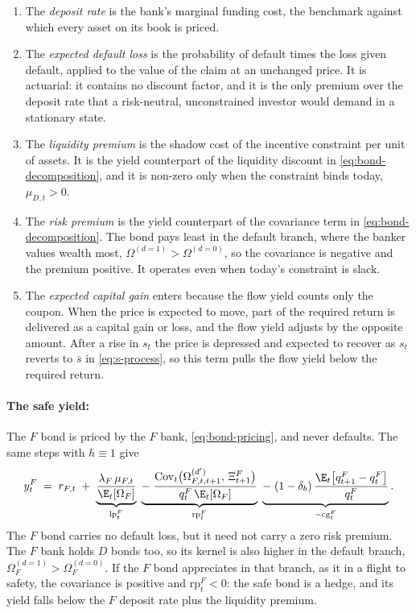 \begin{enumerate}
\item The \emph{deposit rate} is the bank's marginal funding cost, the
  benchmark against which every asset on its book is priced.
\item The \emph{expected default loss} is the probability of default times the
  loss given default, applied to the value of the claim at an unchanged price.
  It is actuarial: it contains no discount factor, and it is the only premium
  over the deposit rate that a risk-neutral, unconstrained investor would demand
  in a stationary state.
\item The \emph{liquidity premium} is the shadow cost of the incentive
  constraint per unit of assets. It is the yield counterpart of the
  liquidity discount in \eqref{eq:bond-decomposition}, and it is non-zero only
  when the constraint binds today, $\mu_{D,t}>0$.
\item The \emph{risk premium} is the yield counterpart of the covariance term in
  \eqref{eq:bond-decomposition}. The bond pays least in the default branch,
  where the banker values wealth most, $\Omega^{(d=1)}>\Omega^{(d=0)}$, so the
  covariance is negative and the premium positive. It operates even when
  today's constraint is slack.
\item The \emph{expected capital gain} enters because the flow yield counts only
  the coupon. When the price is expected to move, part of the required return is
  delivered as a capital gain or loss, and the flow yield adjusts by the
  opposite amount. After a rise in $s_t$ the price is depressed and expected to
  recover as $s_t$ reverts to $\bar s$ in \eqref{eq:s-process}, so this term
  pulls the flow yield below the required return.
\end{enumerate}

\paragraph{The safe yield:}
The $F$ bond is priced by the $F$ bank, \eqref{eq:bond-pricing}, and never
defaults. The same steps with $h\equiv1$ give
\begin{equation}
y^{F}_t
\;=\;r_{F,t}
\;+\;\underbrace{\frac{\lambda_F\,\mu_{F,t}}{\E_t[\Omega_F]}}_{\mathrm{lp}^{F}_t}
\;\underbrace{-\;\frac{\mathrm{Cov}_t\bigl(\Omega^{(d')}_{F,t,t+1},\,\Xi^{F}_{t+1}\bigr)}
         {q^{F}_t\,\E_t[\Omega_F]}}_{\mathrm{rp}^{F}_t}
\;\underbrace{-\;(1-\delta_b)\,\frac{\E_t\bigl[q^{F}_{t+1}-q^{F}_t\bigr]}{q^{F}_t}}_{-\mathrm{cg}^{F}_t} .
\label{eq:yield-decomposition-F}
\end{equation}
The $F$ bond carries no default loss, but it need not carry a zero risk premium.
The $F$ bank holds $D$ bonds too, so its kernel is also higher in the default
branch, $\Omega^{(d=1)}_{F}>\Omega^{(d=0)}_{F}$. If the $F$ bond appreciates in
that branch, as it  in a flight to safety, the covariance is positive and
$\mathrm{rp}^{F}_t<0$: the safe bond is a hedge, and its yield falls below the
$F$ deposit rate plus the liquidity premium.

